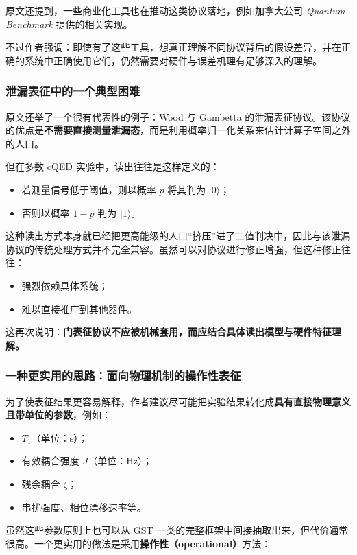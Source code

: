 \documentclass[12pt,a4paper,oneside]{ctexbook}
\begin{document}
原文还提到，一些商业化工具也在推动这类协议落地，例如加拿大公司 \textit{Quantum Benchmark} 提供的相关实现。

不过作者强调：即使有了这些工具，想真正理解不同协议背后的假设差异，并在正确的系统中正确使用它们，仍然需要对硬件与误差机理有足够深入的理解。

\subsubsection{泄漏表征中的一个典型困难}

原文还举了一个很有代表性的例子：Wood 与 Gambetta 的泄漏表征协议。该协议的优点是\textbf{不需要直接测量泄漏态}，而是利用概率归一化关系来估计计算子空间之外的人口。

但在多数 cQED 实验中，读出往往是这样定义的：
\begin{itemize}
    \item 若测量信号低于阈值，则以概率 \(p\) 将其判为 \(|0\rangle\)；
    \item 否则以概率 \(1-p\) 判为 \(|1\rangle\)。
\end{itemize}

这种读出方式本身就已经把更高能级的人口“挤压”进了二值判决中，因此与该泄漏协议的传统处理方式并不完全兼容。虽然可以对协议进行修正增强，但这种修正往往：
\begin{itemize}
    \item 强烈依赖具体系统；
    \item 难以直接推广到其他器件。
\end{itemize}

这再次说明：\textbf{门表征协议不应被机械套用，而应结合具体读出模型与硬件特征理解。}

\subsubsection{一种更实用的思路：面向物理机制的操作性表征}

为了使表征结果更容易解释，作者建议尽可能把实验结果转化成\textbf{具有直接物理意义且带单位的参数}，例如：
\begin{itemize}
    \item \(T_1\)（单位：s）；
    \item 有效耦合强度 \(J\)（单位：Hz）；
    \item 残余耦合 \(\zeta\)；
    \item 串扰强度、相位漂移速率等。
\end{itemize}

虽然这些参数原则上也可以从 GST 一类的完整框架中间接抽取出来，但代价通常很高。一个更实用的做法是采用\textbf{操作性（operational）}方法：
\end{document}
